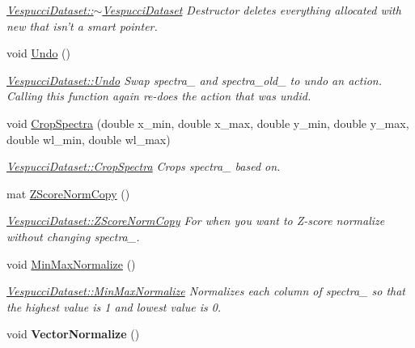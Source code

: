 \begin{DoxyCompactItemize}
\begin{DoxyCompactList}\small\item\em \hyperlink{class_vespucci_dataset_aa9d0b0fd3cff79098cf16d44a94c6204}{Vespucci\+Dataset\+::$\sim$\+Vespucci\+Dataset} Destructor deletes everything allocated with new that isn't a smart pointer. \end{DoxyCompactList}\item 
\hypertarget{class_vespucci_dataset_aff9e3befb759a5a8f54a703434203fb1}{void \hyperlink{class_vespucci_dataset_aff9e3befb759a5a8f54a703434203fb1}{Undo} ()}\label{class_vespucci_dataset_aff9e3befb759a5a8f54a703434203fb1}

\begin{DoxyCompactList}\small\item\em \hyperlink{class_vespucci_dataset_aff9e3befb759a5a8f54a703434203fb1}{Vespucci\+Dataset\+::\+Undo} Swap spectra\+\_\+ and spectra\+\_\+old\+\_\+ to undo an action. Calling this function again re-\/does the action that was undid. \end{DoxyCompactList}\item 
void \hyperlink{class_vespucci_dataset_aa0706b058354cddc5e1fbba68721aa87}{Crop\+Spectra} (double x\+\_\+min, double x\+\_\+max, double y\+\_\+min, double y\+\_\+max, double wl\+\_\+min, double wl\+\_\+max)
\begin{DoxyCompactList}\small\item\em \hyperlink{class_vespucci_dataset_aa0706b058354cddc5e1fbba68721aa87}{Vespucci\+Dataset\+::\+Crop\+Spectra} Crops spectra\+\_\+ based on. \end{DoxyCompactList}\item 
mat \hyperlink{class_vespucci_dataset_a31ef7d438e00a7e1163fc09074e17f97}{Z\+Score\+Norm\+Copy} ()
\begin{DoxyCompactList}\small\item\em \hyperlink{class_vespucci_dataset_a31ef7d438e00a7e1163fc09074e17f97}{Vespucci\+Dataset\+::\+Z\+Score\+Norm\+Copy} For when you want to Z-\/score normalize without changing spectra\+\_\+. \end{DoxyCompactList}\item 
\hypertarget{class_vespucci_dataset_ae6b3fa7cce13ee7f3ad7b93131ac0370}{void \hyperlink{class_vespucci_dataset_ae6b3fa7cce13ee7f3ad7b93131ac0370}{Min\+Max\+Normalize} ()}\label{class_vespucci_dataset_ae6b3fa7cce13ee7f3ad7b93131ac0370}

\begin{DoxyCompactList}\small\item\em \hyperlink{class_vespucci_dataset_ae6b3fa7cce13ee7f3ad7b93131ac0370}{Vespucci\+Dataset\+::\+Min\+Max\+Normalize} Normalizes each column of spectra\+\_\+ so that the highest value is 1 and lowest value is 0. \end{DoxyCompactList}\item 
\hypertarget{class_vespucci_dataset_a07bfc70e12573e809b5ea1707cba35ae}{void {\bfseries Vector\+Normalize} ()}\label{class_vespucci_dataset_a07bfc70e12573e809b5ea1707cba35ae}


\end{DoxyCompactItemize}
